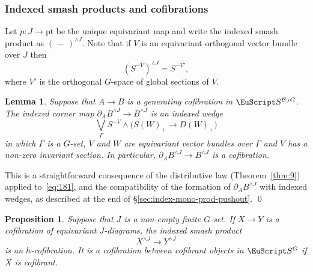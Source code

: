 \documentclass{amsart}
\newtheorem{lem}[equation]{Lemma}
\newtheorem{prop}[equation]{Proposition}
\theoremstyle{definition}
\theoremstyle{remark}
\newenvironment{pf}{\bigskip{\em Proof:\/}}{\qed\medskip}
\newcommand{\slot}{\,-\,}
\newcommand{\spectra}{\EuScript S}
\newcommand{\ugspectra}[1]{\spectra^{#1}}
\newcommand{\cat}[1]{{\mathcal #1}}
\begin{document}
\subsubsection{Indexed smash products and cofibrations}
\label{sec:index-smash-prod}
Let $p:J\to \text{pt}$ be the unique equivariant map and write the
indexed smash product as $(\slot)^{\wedge J}$.  Note that if $V$ is an
equivariant orthogonal vector bundle over $J$ then
\[
(S^{-V})^{\wedge J}=S^{-V'},
\]
where $V'$ is the orthogonal $G$-space of global sections of $V$.

\begin{lem}
\label{thm:247} Suppose that $A\to B$ is a generating cofibration in
$\spectra^{\cat{B}_{J}G}$.  The indexed corner map
$\partial_{A}B^{\wedge J}\to B^{\wedge J}$ is an indexed wedge
\[
\bigvee_{\Gamma} S^{-V}\wedge \big(S(W)_{+}\to D(W)_{+}\big)
\]
in which $\Gamma$ is a $G$-set, $V$ and $W$ are equivariant vector
bundles over $\Gamma$ and $V$ has a non-zero invariant section.  In
particular, $\partial_{A}B^{\wedge J}\to B^{\wedge J}$ is a
cofibration.
\end{lem}

\begin{pf}
This is a straightforward consequence of the distributive law
(Theorem~\ref{thm:9}) applied to~\eqref{eq:181}, and the compatibility
of the formation of $\partial_{A}B^{\wedge J}$ with indexed wedges, as
described at the end of \S\ref{sec:index-mono-prod-pushout}.
\end{pf}

\begin{prop}
\label{thm:195} Suppose that $J$ is a non-empty finite $G$-set.  If
$X\to Y$ is a cofibration of equivariant $J$-diagrams, the indexed
smash product
\[
X^{\wedge J} \to Y^{\wedge J}
\]
is an $h$-cofibration.  It is a cofibration between cofibrant objects
in $\ugspectra{G}$ if $X$ is cofibrant.
\end{prop}
\end{document}
